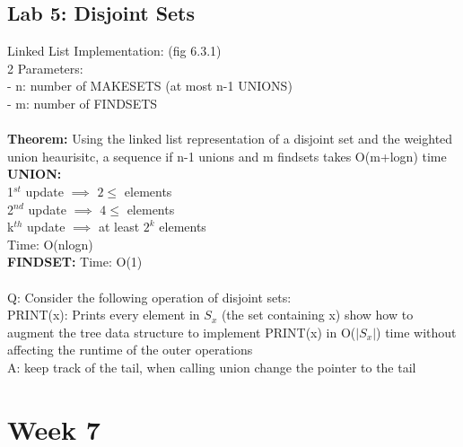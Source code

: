 \documentclass{article}
\begin{document}
	\subsection{Lab 5: Disjoint Sets}
	Linked List Implementation: (fig 6.3.1)\\
	2 Parameters:\\
	- n: number of MAKESETS (at most n-1 UNIONS)\\
	- m: number of FINDSETS\\\\
	\textbf{Theorem: }Using the linked list representation of a disjoint set and the weighted union heaurisitc, a sequence if n-1 unions and m findsets takes O(m+logn) time\\
	\textbf{UNION:}\\
	 1$^{st}$ update $\implies$ $2\le$ elements\\
	2$^{nd}$ update $\implies$ $4\le$ elements\\
	k$^{th}$ update $\implies$ at least $2^k$ elements\\
	Time: O(nlogn)\\
	\textbf{FINDSET:} Time: O(1)\\\\
	Q: Consider the following operation of disjoint sets:\\
	PRINT(x): Prints every element in $S_x$ (the set containing x) show how to augment the tree data structure to implement PRINT(x) in O($|S_x|$) time without affecting the runtime of the outer operations\\
	A: keep track of the tail, when calling union change the pointer to the tail
	
	\section{Week 7}
\end{document}
